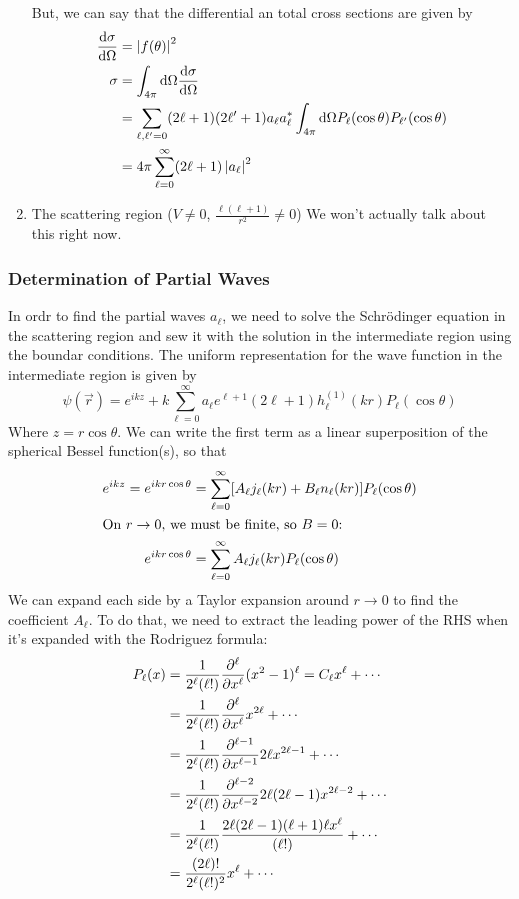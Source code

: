 \documentclass[a4paper]{article}
\begin{document}
\begin{enumerate}
	But, we can say that the differential an total cross sections are given
	by
	\begin{align*}
		\frac{\mathrm{d} \sigma}{\mathrm{d} \Omega} &= \left\lvert f(\theta)\right\rvert^2\\
		\sigma &= \int_{4\pi}\mathrm{d}\Omega\frac{\mathrm{d} \sigma}{\mathrm{d} \Omega}\\
		&= \sum_{\ell,\ell'=0}(2\ell+1)(2\ell'+1)a_\ell a^\ast_\ell
		\int_{4\pi}\mathrm{d}\Omega P_\ell(\cos\theta) P_{\ell'}(\cos\theta)\\
		&= 4\pi\sum_{\ell=0}^\infty(2\ell+1)\left\lvert a_\ell\right\rvert^2
	\end{align*}
\item The scattering region ($V\neq 0$, $\frac{\ell(\ell+1)}{r^2}\neq 0$)
	We won't actually talk about this right now.
\end{enumerate}

\subsubsection{Determination of Partial Waves}
In ordr to find the partial waves $a_\ell$, we need to solve the Schr\"odinger
equation in the scattering region and sew it with the solution in the
intermediate region using the boundar conditions. The uniform representation
for the wave function in the intermediate region is given by
\[
	\psi(\vec{r}) = e^{ikz} + k\sum_{\ell=0}^\infty a_\ell
	e^{\ell+1}(2\ell+1) h_\ell^{(1)}(kr) P_\ell(\cos\theta)
\]
Where $z=r\cos\theta$. We can write the first term as a linear superposition of
the spherical Bessel function(s), so that
\begin{align*}
	e^{ikz} = e^{ikr\cos\theta} &=
	\sum_{\ell=0}^\infty[A_\ell j_\ell(kr) + B_\ell
	n_\ell(kr)]P_\ell(\cos\theta)\\
	\intertext{On $r\to0$, we must be finite, so $B = 0$:}
	e^{ikr\cos\theta} &= \sum_{\ell=0}^\infty A_\ell j_\ell(kr)
	P_\ell(\cos\theta)
\end{align*}
We can expand each side by a Taylor expansion around
$r\to0$ to find the coefficient $A_\ell$. To do that, we need to
extract the leading power of the RHS when it's expanded with the Rodriguez
formula:
\begin{align*}
	P_\ell(x) &= \frac{1}{2^\ell(\ell!)}\pd[\ell]{x}(x^2-1)^\ell =
	C_\ell x^\ell + \cdots\\
	&= \frac{1}{2^\ell(\ell!)}\pd[\ell]{x}x^{2\ell} + \cdots\\
	&= \frac{1}{2^\ell(\ell!)}\pd[\ell-1]{x}2\ell x^{2\ell-1} + \cdots\\
	&= \frac{1}{2^\ell(\ell!)}\pd[\ell-2]{x}2\ell(2\ell-1)
		x^{2\ell-2} + \cdots\\
	&= \frac{1}{2^\ell(\ell!)}\frac{2\ell(2\ell-1)(\ell+1)\ell x^\ell}
		{(\ell!)} + \cdots\\
	&= \frac{(2\ell)!}{2^\ell(\ell!)^2}x^\ell + \cdots
\end{align*}
\end{document}
